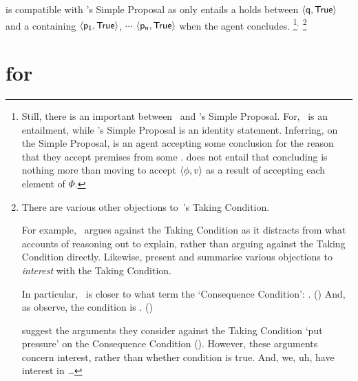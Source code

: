 \begin{note}
  \supportI{} is compatible with \citeauthor{Wright:2014tt}'s Simple Proposal as \supportI{} only entails a \ros{} holds between \(\pv{\propM{q}}{\valI{True}}\) and a \pool{} containing \(\pv{\propM{p_{1}}}{\valI{True}}\), \(\cdots\) \(\pv{\propM{p_{n}}}{\valI{True}}\) when the agent concludes.%
  \footnote{
    Still, there is an important between~\supportI{} and \citeauthor{Wright:2014tt}'s Simple Proposal.
    For,~\supportI{} is an entailment, while \citeauthor{Wright:2014tt}'s Simple Proposal is an identity statement.
    Inferring, on the Simple Proposal, is an agent accepting some conclusion for the reason that they accept premises from some \pool{}.
    \supportI{} does not entail that concluding is nothing more than moving to accept \(\langle \phi, v \rangle\) as a result of accepting each element of \(\Phi\).
  }\(^{,}\)%
  \footnote{
    There are various other objections to~\citeauthor{Boghossian:2014aa}'s Taking Condition.

    For example,~\citeauthor{Hlobil:2014tq} argues against the Taking Condition as it distracts from what accounts of reasoning out to explain, rather than arguing against the Taking Condition directly.
    Likewise, \citeauthor{McHugh:2016vp} present and summarise various objections to \emph{interest} with the Taking Condition.

    In particular,~\supportI{} is closer to what \citeauthor{McHugh:2016vp} term the `Consequence Condition': .
    (\citeyear[316]{McHugh:2016vp})
    And, as \citeauthor{McHugh:2016vp} observe, the condition is .
    (\citeyear[316]{McHugh:2016vp})

    \citeauthor{McHugh:2016vp} suggest the arguments they consider against the Taking Condition `put pressure' on the Consequence Condition (\citeyear[327]{McHugh:2016vp}).
    However, these arguments concern interest, rather than whether condition is true.
    And, we, uh, have interest in \dots
  }
\end{note}



\section{ for }
\label{cha:ros:W}

